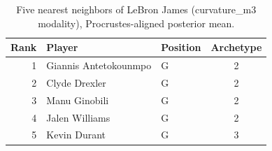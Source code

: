 \begin{table}[htbp]
  \centering\small
  \begin{tabular}{rllc}
    \toprule
    Rank & Player & Position & Archetype \\
    \midrule
    1 & Giannis Antetokounmpo & G & 2 \\
    2 & Clyde Drexler & G & 2 \\
    3 & Manu Ginobili & G & 2 \\
    4 & Jalen Williams & G & 2 \\
    5 & Kevin Durant & G & 3 \\
    \bottomrule
  \end{tabular}
  \caption{Five nearest neighbors of LeBron James (curvature_m3 modality), Procrustes-aligned posterior mean.}
  \label{tab:LeBron_James_neighbors_curvature_m3}
\end{table}

